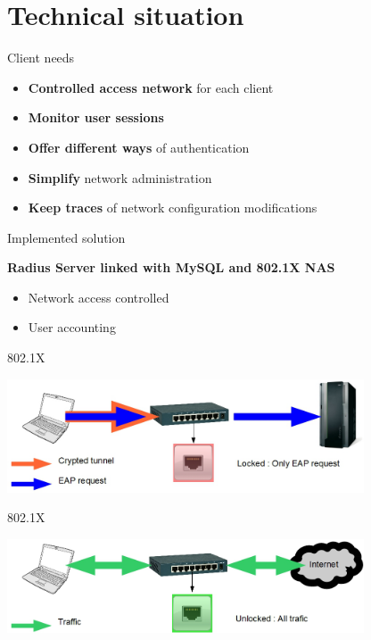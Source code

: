 \documentclass[12pt]{beamer}
\begin{document}
\section{Technical situation}

\begin{frame}{Client needs}
    \begin{itemize}[<+->]
	\item \textbf{Controlled access network} for each client
	\vfill
	\item \textbf{Monitor user sessions}
	\vfill 
	\item \textbf{Offer different ways} of authentication
	\vfill
	\item \textbf{Simplify} network administration
	\vfill
	\item \textbf{Keep traces} of network configuration modifications
    \end{itemize}
\end{frame}

\begin{frame}{Implemented solution}
    \begin{center}
    \textbf{Radius Server linked with MySQL and 802.1X NAS}
    \end{center}

    \pause
    \begin{itemize}[<+->]\vfill
	\item Network access controlled\vfill
	\item User accounting\vfill
    \end{itemize}
\end{frame}

\begin{frame}{802.1X}
\vfill
\begin{center}
    \includegraphics[width=300pt]{img/dot1x_1.png}
\end{center}
\vfill
\end{frame}

\begin{frame}{802.1X}
\vfill
\begin{center}
    \includegraphics[width=300pt]{img/dot1x_2.png}
\end{center}
\vfill
\end{frame}
\end{document}
